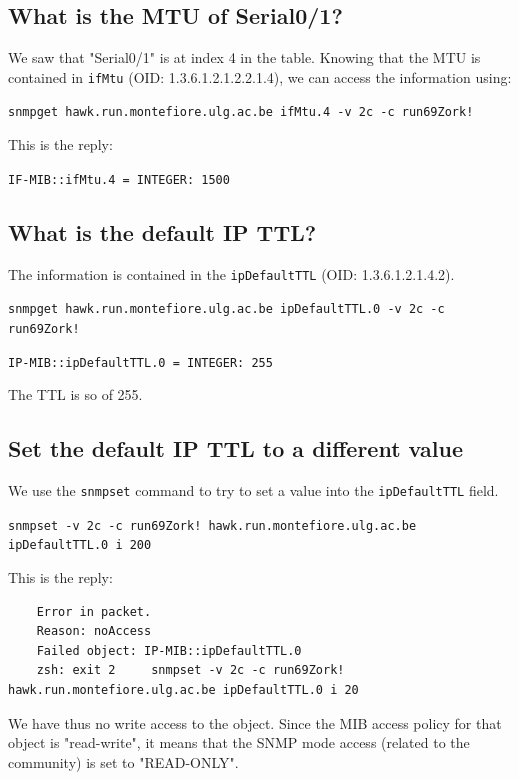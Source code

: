 \documentclass[a4paper,titlepage]{article}
\begin{document}
	\subsection{What is the MTU of Serial0/1?}
We saw that "Serial0/1" is at index 4 in the table. Knowing that the MTU is contained in \texttt{ifMtu} (OID: 1.3.6.1.2.1.2.2.1.4), we can access the information using: 
\begin{center}
	\texttt{snmpget hawk.run.montefiore.ulg.ac.be ifMtu.4 -v 2c -c run69Zork!}
\end{center}
This is the reply: 
\begin{center}
	\texttt{IF-MIB::ifMtu.4 = INTEGER: 1500}
\end{center}

	\subsection{What is the default IP TTL?}
The information is contained in the \texttt{ipDefaultTTL} (OID: 1.3.6.1.2.1.4.2). 

\begin{center}
	\texttt{snmpget hawk.run.montefiore.ulg.ac.be ipDefaultTTL.0 -v 2c -c run69Zork!}
\end{center}
\begin{center}
	\texttt{IP-MIB::ipDefaultTTL.0 = INTEGER: 255}
\end{center}
The TTL is so of 255.

	\subsection{Set the default IP TTL to a different value}
We use the \texttt{snmpset} command to try to set a value into the \texttt{ipDefaultTTL} field.
\begin{center}
	\texttt{snmpset -v 2c -c run69Zork! hawk.run.montefiore.ulg.ac.be ipDefaultTTL.0 i 200}
\end{center}
This is the reply:
\begin{verbatim}
	Error in packet.
	Reason: noAccess
	Failed object: IP-MIB::ipDefaultTTL.0
	zsh: exit 2     snmpset -v 2c -c run69Zork! hawk.run.montefiore.ulg.ac.be ipDefaultTTL.0 i 20
\end{verbatim}
We have thus no write access to the object. Since the MIB access policy for that object is "read-write", it means that the SNMP mode access (related to the community) is set to "READ-ONLY".
\end{document}
